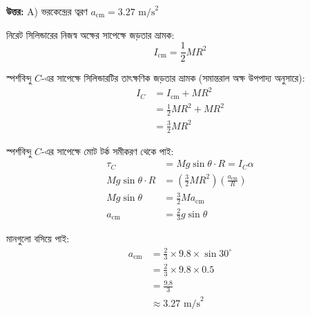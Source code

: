 \documentclass[12pt, a4paper]{article}
\begin{document}
\vspace{0.5em}
\begin{tcolorbox}[answerbox]
    \textbf{\color{success} উত্তর:} A) ভরকেন্দ্রের ত্বরণ $a_{\text{cm}} = 3.27\text{ m/s}^2$
\end{tcolorbox}
\vspace{1em}

\begin{tcolorbox}[solutionbox={সমাধান (Solution)}]
    \noindent
    নিরেট সিলিন্ডারের নিজস্ব অক্ষের সাপেক্ষে জড়তার ভ্রামক:
    \[ I_{\text{cm}} = \frac{1}{2} M R^2 \]
    
    স্পর্শবিন্দু $C$-এর সাপেক্ষে সিলিন্ডারটির তাৎক্ষণিক জড়তার ভ্রামক (সমান্তরাল অক্ষ উপপাদ্য অনুসারে):
    \begin{align*}
        I_C &= I_{\text{cm}} + M R^2 \\
        &= \frac{1}{2} M R^2 + M R^2 \\
        &= \frac{3}{2} M R^2
    \end{align*}
    
    স্পর্শবিন্দু $C$-এর সাপেক্ষে মোট টর্ক সমীকরণ থেকে পাই:
    \begin{align*}
        \tau_C &= M g \sin\theta \cdot R = I_C \alpha \\
        M g \sin\theta \cdot R &= \left(\frac{3}{2} M R^2\right) \left(\frac{a_{\text{cm}}}{R}\right) \\
        M g \sin\theta &= \frac{3}{2} M a_{\text{cm}} \\
        a_{\text{cm}} &= \frac{2}{3} g \sin\theta
    \end{align*}
    
    মানগুলো বসিয়ে পাই:
    \begin{align*}
        a_{\text{cm}} &= \frac{2}{3} \times 9.8 \times \sin 30^\circ \\
        &= \frac{2}{3} \times 9.8 \times 0.5 \\
        &= \frac{9.8}{3} \\
        &\approx 3.27\text{ m/s}^2
    \end{align*}
\end{tcolorbox}
\end{document}
